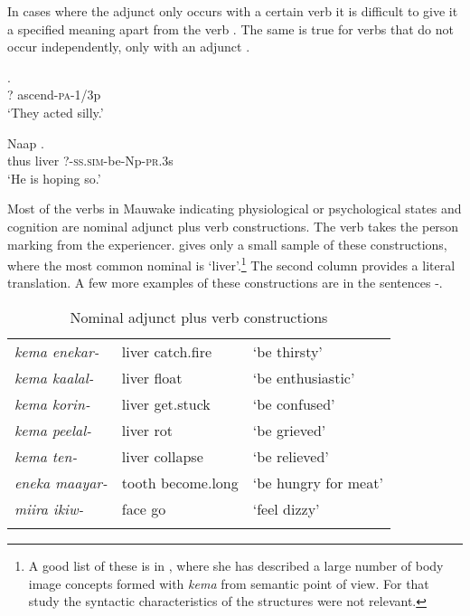 In cases where the adjunct only occurs with a certain verb it is difficult to give it a specified meaning apart from the verb . The same is true for verbs that do not occur independently, only with an adjunct .

\ea%
\label{ex:3:x454}
\gll {} . \\
? ascend-\textsc{pa}-1/3p\\
\glt`They acted silly.'
\z

\ea%
\label{ex:3:x455}
\gll Naap  . \\
thus liver ?-\textsc{ss}.\textsc{sim}-be-Np-\textsc{pr}.3s\\
\glt`He is hoping so.'
\z

Most of the verbs in Mauwake indicating physiological or psychological states and cognition are nominal adjunct plus verb constructions. The verb takes the person marking from the experiencer.  gives only a small sample of these constructions, where the most common nominal is  `liver'.\footnote{A good list of these is in \citet[47--63]{Kwan1989}, where she has described a large number of body image concepts formed with \textit{kema} from semantic point of view. For that study the syntactic characteristics of the structures were not relevant.} The second column provides a literal translation. A few more examples of these constructions are in the sentences -.

\begin{table}
\caption{Nominal adjunct plus verb constructions}
\label{tab:3:nominaladjunctplusverbconstruction}

\begin{tabular}{>{\it}lll}
\mytoprule
kema enekar- &liver catch.fire &`be thirsty'\\
kema kaalal- &liver float &`be enthusiastic'\\
kema korin- &liver get.stuck &`be confused'\\
kema peelal- &liver rot &`be grieved'\\
kema ten- &liver collapse &`be relieved'\\
eneka maayar- &tooth become.long &`be hungry for meat'\\
miira ikiw- &face go &`feel dizzy'\\
\mybottomrule 
\end{tabular}

\end{table}


